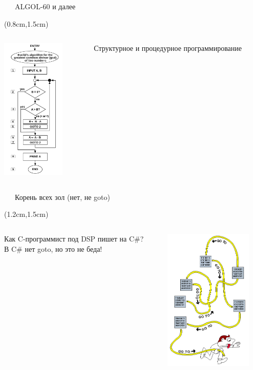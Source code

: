 \documentclass[xetex,18pt,aspectratio=43]{beamer}
\begin{document}
\begin{Large}
\begin{frame}{\ \ \ ALGOL-60 и далее}
\begin{textblock*}{\framewidth}(0.8cm,1.5cm)
  \begin{columns}[onlytextwidth,t]
    \begin{column}{0.5\textwidth}
      \centering
      \includegraphics[height=6.8cm,valign=t]{img/algorithm}
    \end{column}
    \begin{column}{0.5\textwidth}
    Структурное и процедурное программирование
    \end{column}
  \end{columns}
\end{textblock*}
\end{frame}

\begin{frame}{\ \ \ Корень всех зол (нет, не goto)}
\begin{textblock*}{\framewidth-0.5cm}(1.2cm,1.5cm)
  \begin{columns}[onlytextwidth,t]
    \begin{column}{0.5\textwidth}
      Как C-программист под DSP пишет на C{\lserif\#}?\\
      {\small В C{\lserif\#} нет goto, но это не беда!}
    \end{column}
    \begin{column}{0.5\textwidth}
      \centering
      \includegraphics[height=6.8cm,valign=t]{img/spaghetti.png}
    \end{column}
  \end{columns}
\end{textblock*}
\end{frame}


\end{Large}
\end{document}
